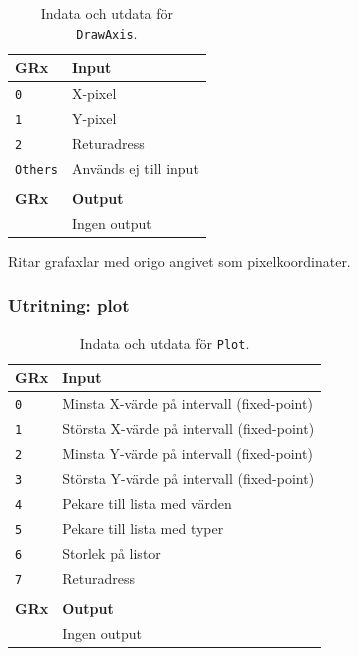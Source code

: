 \documentclass[]{article}
\begin{document}
\begin{table}[H]
\centering
\begin{tabular}{ll}
	\textbf{GRx}    & \textbf{Input}        \\ \hline
	\texttt{0}      & X-pixel               \\
	\texttt{1}      & Y-pixel               \\
	\texttt{2}      & Returadress           \\
	\texttt{Others} & Används ej till input \\
	             &  \\
	\textbf{GRx} & \textbf{Output}              \\ \hline
	             & Ingen output
\end{tabular}
\caption{Indata och utdata för \texttt{DrawAxis}.}
\end{table}

\noindent
Ritar grafaxlar med origo angivet som pixelkoordinater.

\subsubsection{Utritning: plot}

\begin{table}[H]
\centering
\begin{tabular}{ll}
	\textbf{GRx} & \textbf{Input}               \\ \hline
	\texttt{0}   & Minsta X-värde på intervall (fixed-point)  \\
	\texttt{1}   & Största X-värde på intervall (fixed-point) \\
	\texttt{2}   & Minsta Y-värde på intervall (fixed-point)  \\
	\texttt{3}   & Största Y-värde på intervall (fixed-point) \\
	\texttt{4}   & Pekare till lista med värden \\
	\texttt{5}   & Pekare till lista med typer  \\
	\texttt{6}   & Storlek på listor            \\
	\texttt{7}   & Returadress                  \\
	             &  \\
	\textbf{GRx} & \textbf{Output}              \\ \hline
	             & Ingen output
\end{tabular}
\caption{Indata och utdata för \texttt{Plot}.}
\end{table}
\end{document}

